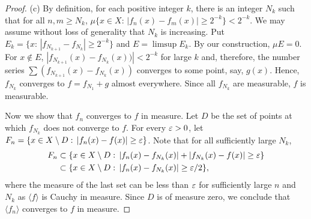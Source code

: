 \begin{proof}
    (c) By definition, for each positive integer $k$, there is an integer $N_k$ 
    such that for all $n,m\ge N_k$, $\mu\{x\in X:\,|f_n(x)-f_m(x)|\ge 2^{-k}\}<
    2^{-k}$. We may assume without loss of generality that $N_k$ is increasing.
    Put $E_k=\{x:\, |f_{N_{k+1}}-f_{N_k}|\ge 2^{-k}\}$ and $E=\limsup E_k$. By
    our construction, $\mu E=0$. For $x\notin E$, $|f_{N_{k+1}}(x)-f_{N_k}(x))|
    <2^{-k}$ for large $k$ and, therefore, the number series $\sum(f_{N_{k+1}}
    (x)-f_{N_k}(x))$ converges to some point, say, $g(x)$. Hence, $f_{N_k}$
    converges to $f=f_{N_1}+g$ almost everywhere. Since all $f_{N_k}$ are
    measurable, $f$ is measurable.\par
    Now we show that $f_n$ converges to $f$ in measure. Let $D$ be the set of
    points at which $f_{N_k}$ does not converge to $f$. For every $\varepsilon>0$,
    let $F_n=\{x\in X\setminus D:\, |f_n(x)-f(x)|\ge\varepsilon\}$. Note that for 
    all sufficiently large $N_k$,
    \begin{align*}
      F_n
      &\subset\{x\in X\setminus D:\,|f_n(x)-f_{N_k}(x)|+|f_{N_k}(x)-f(x)|
      \ge\varepsilon \}\\
      &\subset\{x\in X\setminus D:\,|f_n(x)-f_{N_k}(x)|\ge\varepsilon/2\},
    \end{align*}
    where the measure of the last set can be less than $\varepsilon$ for sufficiently
    large $n$ and $N_k$ as $\langle f\rangle$ is Cauchy in measure. Since $D$
    is of measure zero, we conclude that $\langle f_n\rangle$ converges to $f$
    in measure.
  \end{proof}
  
  
